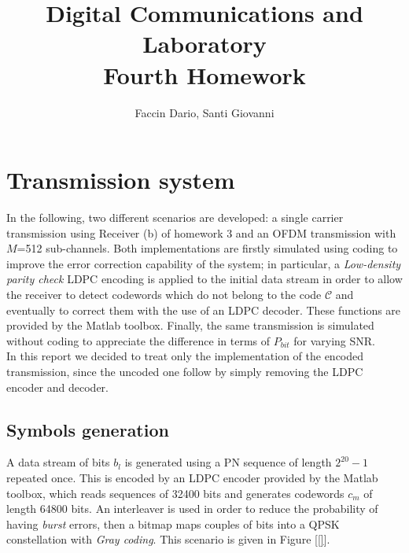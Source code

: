 \documentclass[a4paper, 12pt]{report}
\begin{document}
	
\title{Digital Communications and Laboratory \\ Fourth Homework}
\author{Faccin Dario, Santi Giovanni}
\date{}
\maketitle

\section*{Transmission system}
In the following, two different scenarios are developed: a single carrier transmission using Receiver (b) of homework 3 and an OFDM transmission with $M$=512 sub-channels. Both implementations are firstly simulated using coding to improve the error correction capability of the system; in particular, a \textit{Low-density parity check} LDPC encoding is applied to the initial data stream in order to allow the receiver to detect codewords which do not belong to the code $\mathcal{C}$ and eventually to correct them with the use of an LDPC decoder. These functions are provided by the Matlab toolbox. Finally, the same transmission is simulated without coding to appreciate the difference in terms of $P_{bit}$ for varying SNR. \\
In this report we decided to treat only the implementation of the encoded transmission, since the uncoded one follow by simply removing the LDPC encoder and decoder.

\subsection*{Symbols generation}
A data stream of bits $b_l$ is generated using a PN sequence of length $2^{20}-1$ repeated once. This is encoded by an LDPC encoder provided by the Matlab toolbox, which reads sequences of 32400 bits and generates codewords $c_m$ of length 64800 bits. An interleaver is used in order to reduce the probability of having \textit{burst} errors, then a bitmap maps couples of bits into a QPSK constellation with \textit{Gray coding}. This scenario is given in Figure [\ref{}].
\end{document}

